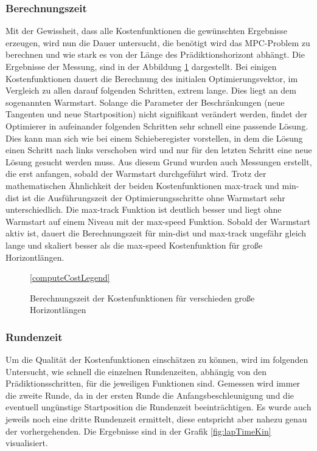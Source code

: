 \documentclass{like}
\begin{document}
\subsubsection{Berechnungszeit}
\label{runtime}
Mit der Gewissheit, dass alle Kostenfunktionen die gewünschten Ergebnisse erzeugen, wird nun die Dauer untersucht, die benötigt wird das \ac{MPC}-Problem zu berechnen und wie stark es von der Länge des Prädiktionshorizont abhängt. 
Die Ergebnisse der Messung, sind in der Abbildung \ref{fig:computeCost} dargestellt. Bei einigen Kostenfunktionen dauert die  Berechnung des initialen Optimierungsvektor, im Vergleich zu allen darauf folgenden Schritten, extrem lange. Dies liegt an dem sogenannten Warmstart. Solange die Parameter der Beschränkungen (neue Tangenten und neue Startposition) nicht signifikant verändert werden, findet der Optimierer in aufeinander folgenden Schritten sehr schnell eine passende Lösung. Dies kann man sich wie bei einem Schieberegister vorstellen, in dem die Lösung einen Schritt nach links verschoben wird und nur für den letzten Schritt eine neue Lösung gesucht werden muss. Aus diesem Grund wurden auch Messungen erstellt, die erst anfangen, sobald der Warmstart durchgeführt wird. 
Trotz der mathematischen Ähnlichkeit der beiden Kostenfunktionen max-track und min-dist ist die Ausführungszeit der Optimierungsschritte ohne Warmstart sehr unterschiedlich. Die max-track Funktion ist deutlich besser und liegt ohne Warmstart auf einem Niveau mit der max-speed Funktion.
Sobald der Warmstart aktiv ist, dauert die Berechnungszeit für min-dist und max-track ungefähr gleich lange und skaliert besser als die max-speed Kostenfunktion für große Horizontlängen.
\begin{figure}
	\centering

	\ref{computeCostLegend}
	\caption{Berechnungszeit der Kostenfunktionen für verschieden große Horizontlängen}\label{fig:computeCost}
\end{figure}



\subsubsection{Rundenzeit}
\label{laptime}
Um die Qualität der Kostenfunktionen einschätzen zu können, wird im folgenden Untersucht, wie schnell die einzelnen Rundenzeiten, abhängig von den Prädiktionsschritten, für die jeweiligen Funktionen sind.
Gemessen wird immer die zweite Runde, da in der ersten Runde die Anfangsbeschleunigung und die eventuell ungünstige Startposition die Rundenzeit beeinträchtigen. Es wurde auch jeweils noch eine dritte Rundenzeit ermittelt, diese entspricht aber nahezu genau der vorhergehenden. Die Ergebnisse sind in der Grafik \ref{fig:lapTimeKin} visualisiert.
\end{document}
